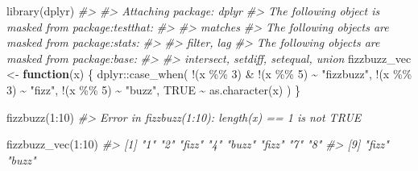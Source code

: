 \documentclass[
]{book}
\newenvironment{Shaded}{\begin{snugshade}}{\end{snugshade}}
\newcommand{\CommentTok}[1]{\textcolor[rgb]{0.56,0.35,0.01}{\textit{#1}}}
\newcommand{\ConstantTok}[1]{\textcolor[rgb]{0.00,0.00,0.00}{#1}}
\newcommand{\ControlFlowTok}[1]{\textcolor[rgb]{0.13,0.29,0.53}{\textbf{#1}}}
\newcommand{\DecValTok}[1]{\textcolor[rgb]{0.00,0.00,0.81}{#1}}
\newcommand{\FunctionTok}[1]{\textcolor[rgb]{0.00,0.00,0.00}{#1}}
\newcommand{\NormalTok}[1]{#1}
\newcommand{\OtherTok}[1]{\textcolor[rgb]{0.56,0.35,0.01}{#1}}
\newcommand{\SpecialCharTok}[1]{\textcolor[rgb]{0.00,0.00,0.00}{#1}}
\newcommand{\StringTok}[1]{\textcolor[rgb]{0.31,0.60,0.02}{#1}}
\begin{document}
\begin{Shaded}
\begin{Highlighting}[]
\FunctionTok{library}\NormalTok{(dplyr)}
\CommentTok{\#\textgreater{} }
\CommentTok{\#\textgreater{} Attaching package: \textquotesingle{}dplyr\textquotesingle{}}
\CommentTok{\#\textgreater{} The following object is masked from \textquotesingle{}package:testthat\textquotesingle{}:}
\CommentTok{\#\textgreater{} }
\CommentTok{\#\textgreater{}     matches}
\CommentTok{\#\textgreater{} The following objects are masked from \textquotesingle{}package:stats\textquotesingle{}:}
\CommentTok{\#\textgreater{} }
\CommentTok{\#\textgreater{}     filter, lag}
\CommentTok{\#\textgreater{} The following objects are masked from \textquotesingle{}package:base\textquotesingle{}:}
\CommentTok{\#\textgreater{} }
\CommentTok{\#\textgreater{}     intersect, setdiff, setequal, union}
\NormalTok{fizzbuzz\_vec }\OtherTok{\textless{}{-}} \ControlFlowTok{function}\NormalTok{(x) \{}
\NormalTok{  dplyr}\SpecialCharTok{::}\FunctionTok{case\_when}\NormalTok{(}
    \SpecialCharTok{!}\NormalTok{(x }\SpecialCharTok{\%\%} \DecValTok{3}\NormalTok{) }\SpecialCharTok{\&} \SpecialCharTok{!}\NormalTok{(x }\SpecialCharTok{\%\%} \DecValTok{5}\NormalTok{) }\SpecialCharTok{\textasciitilde{}} \StringTok{"fizzbuzz"}\NormalTok{,}
    \SpecialCharTok{!}\NormalTok{(x }\SpecialCharTok{\%\%} \DecValTok{3}\NormalTok{) }\SpecialCharTok{\textasciitilde{}} \StringTok{"fizz"}\NormalTok{,}
    \SpecialCharTok{!}\NormalTok{(x }\SpecialCharTok{\%\%} \DecValTok{5}\NormalTok{) }\SpecialCharTok{\textasciitilde{}} \StringTok{"buzz"}\NormalTok{,}
    \ConstantTok{TRUE} \SpecialCharTok{\textasciitilde{}} \FunctionTok{as.character}\NormalTok{(x)}
\NormalTok{  )}
\NormalTok{\}}
\end{Highlighting}
\end{Shaded}

\begin{Shaded}
\begin{Highlighting}[]
\FunctionTok{fizzbuzz}\NormalTok{(}\DecValTok{1}\SpecialCharTok{:}\DecValTok{10}\NormalTok{)}
\CommentTok{\#\textgreater{} Error in fizzbuzz(1:10): length(x) == 1 is not TRUE}
\end{Highlighting}
\end{Shaded}

\begin{Shaded}
\begin{Highlighting}[]
\FunctionTok{fizzbuzz\_vec}\NormalTok{(}\DecValTok{1}\SpecialCharTok{:}\DecValTok{10}\NormalTok{)}
\CommentTok{\#\textgreater{}  [1] "1"    "2"    "fizz" "4"    "buzz" "fizz" "7"    "8"   }
\CommentTok{\#\textgreater{}  [9] "fizz" "buzz"}
\end{Highlighting}
\end{Shaded}
\end{document}
